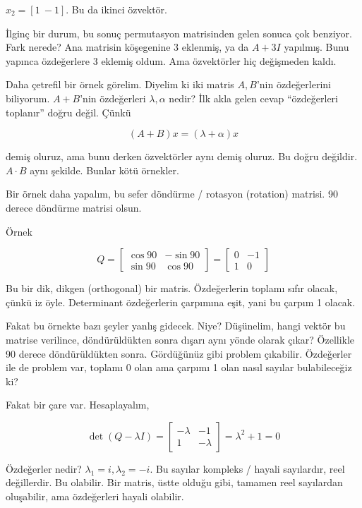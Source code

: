 \documentclass[12pt,fleqn]{article}\usepackage{../../common}
\begin{document}
$x_2 = [1 \ -1]$. Bu da ikinci özvektör.

İlginç bir durum, bu sonuç permutasyon matrisinden gelen sonuca çok
benziyor. Fark nerede? Ana matrisin köşegenine 3 eklenmiş, ya da $A + 3I$
yapılmış. Bunu yapınca özdeğerlere 3 eklemiş oldum. Ama özvektörler hiç
değişmeden kaldı.

Daha çetrefil bir örnek görelim. Diyelim ki iki matris $A,B$'nin
özdeğerlerini biliyorum. $A+B$'nin özdeğerleri $\lambda,\alpha$ nedir?  İlk
akla gelen cevap ``özdeğerleri toplanır'' doğru değil. Çünkü

$$ (A+B)x = (\lambda+\alpha)x $$

demiş oluruz, ama bunu derken özvektörler aynı demiş oluruz. Bu doğru
değildir. $A \cdot B$ aynı şekilde. Bunlar kötü örnekler. 

Bir örnek daha yapalım, bu sefer döndürme / rotasyon (rotation) matrisi. 90
derece döndürme matrisi olsun.

Örnek

$$ Q =  
\left[\begin{array}{ccc}
\cos 90 & -\sin 90 \\
\sin 90 & \cos 90
\end{array}\right]
= \left[\begin{array}{ccc}
0 & -1\\
1  & 0
\end{array}\right]
$$

Bu bir dik, dikgen (orthogonal) bir matris. Özdeğerlerin toplamı sıfır
olacak, çünkü iz öyle. Determinant özdeğerlerin çarpımına eşit, yani bu
çarpım 1 olacak.

Fakat bu örnekte bazı şeyler yanlış gidecek. Niye? Düşünelim, hangi vektör
bu matrise verilince, döndürüldükten sonra dışarı aynı yönde olarak çıkar?
Özellikle 90 derece döndürüldükten sonra. Gördüğünüz gibi problem
çıkabilir.  Özdeğerler ile de problem var, toplamı 0 olan ama çarpımı 1
olan nasıl sayılar bulabileceğiz ki?

Fakat bir çare var. Hesaplayalım, 

$$ \det(Q - \lambda I) = 
\left[\begin{array}{ccc}
-\lambda & -1 \\
1 & -\lambda
\end{array}\right] = \lambda^2 + 1 = 0
 $$

Özdeğerler nedir? $\lambda_1 = i, \lambda_2 = -i$. Bu sayılar kompleks / hayali
sayılardır, reel değillerdir. Bu olabilir. Bir matris, üstte olduğu gibi,
tamamen reel sayılardan oluşabilir, ama özdeğerleri hayali olabilir. 
\end{document}
